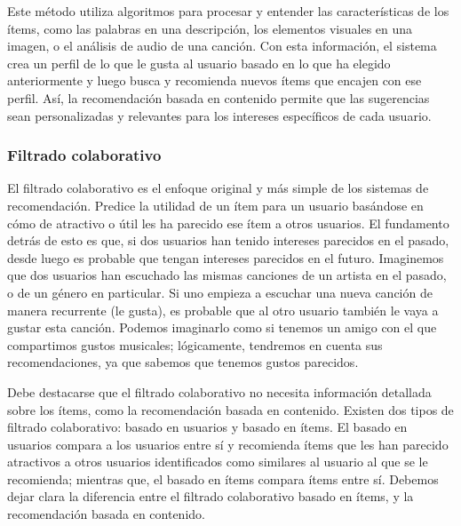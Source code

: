  Este método utiliza algoritmos para procesar y entender las características de los ítems, como las palabras en una descripción, los elementos 
 visuales en una imagen, o el análisis de audio de una canción. Con esta información, el sistema crea un perfil de lo que le gusta al usuario basado en 
 lo que ha elegido anteriormente y luego busca y recomienda nuevos ítems que encajen con ese perfil. Así, la recomendación basada en contenido permite que las sugerencias sean 
 personalizadas y relevantes para los intereses específicos de cada usuario.


\subsubsection{Filtrado colaborativo\label{SEC:RECOMENDADORES_COLABORATIVOS}}

El filtrado colaborativo es el enfoque original y más simple de los sistemas de recomendación. Predice la utilidad de un ítem para un usuario basándose en
cómo de atractivo o útil les ha parecido ese ítem a otros usuarios. El fundamento detrás de esto es que, si dos usuarios han tenido intereses parecidos en el
pasado, desde luego es probable que tengan intereses parecidos en el futuro. Imaginemos que dos usuarios han escuchado las mismas canciones de un artista
en el pasado, o de un género en particular. Si uno empieza a escuchar una nueva canción de manera recurrente (le gusta), es probable que al otro usuario
también le vaya a gustar esta canción. Podemos imaginarlo como si tenemos un amigo con el que compartimos gustos musicales; lógicamente, tendremos en cuenta 
sus recomendaciones, ya que sabemos que tenemos gustos parecidos.

Debe destacarse que el filtrado colaborativo no necesita información detallada sobre los ítems, como la recomendación basada en contenido. Existen dos tipos
de filtrado colaborativo: basado en usuarios y basado en ítems. El basado en usuarios compara a los usuarios entre sí y recomienda ítems que les han parecido
atractivos a otros usuarios identificados como similares al usuario al que se le recomienda; mientras que, el basado en ítems compara
ítems entre sí. Debemos dejar clara la diferencia entre el filtrado colaborativo basado en ítems, y la recomendación basada en contenido.

